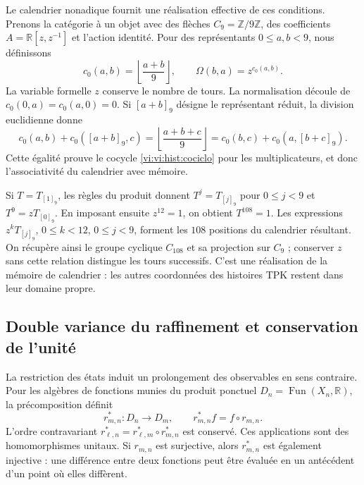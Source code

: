 Le calendrier nonadique fournit une réalisation effective de ces
conditions. Prenons la catégorie à un objet avec des flèches
\(C_9=\mathbb Z/9\mathbb Z\), des coefficients
\(A=\mathbb R[z,z^{-1}]\) et l’action identité. Pour des représentants
\(0\le a,b<9\), nous définissons
\begin{equation}
 c_0(a,b)=\left\lfloor\frac{a+b}{9}\right\rfloor,
 \qquad\Omega(b,a)=z^{c_0(a,b)}.
 \label{vi:vi:hist:carry-calendario}
\end{equation}
La variable formelle \(z\) conserve le nombre de tours. La normalisation
découle de \(c_0(0,a)=c_0(a,0)=0\). Si \([a+b]_9\) désigne le
représentant réduit, la division euclidienne donne
\[
 c_0(a,b)+c_0([a+b]_9,c)
 =\left\lfloor\frac{a+b+c}{9}\right\rfloor
 =c_0(b,c)+c_0(a,[b+c]_9).
\]
Cette égalité prouve le cocycle \eqref{vi:vi:hist:cociclo} pour les
multiplicateurs, et donc l’associativité du calendrier avec mémoire.

Si \(T=T_{[1]_9}\), les règles du produit donnent
\(T^j=T_{[j]_9}\) pour \(0\le j<9\) et \(T^9=zT_{[0]_9}\).
En imposant ensuite \(z^{12}=1\), on obtient \(T^{108}=1\).
Les expressions \(z^kT_{[j]_9}\), \(0\le k<12\), \(0\le j<9\),
forment les \(108\) positions du calendrier résultant. On récupère ainsi
le groupe cyclique \(C_{108}\) et sa projection sur \(C_9\) ; conserver
\(z\) sans cette relation distingue les tours successifs. C’est une
réalisation de la mémoire de calendrier : les autres coordonnées des
histoires TPK restent dans leur domaine propre.

\subsection{Double variance du raffinement et conservation de l’unité}
\label{vi:hist:doble-varianza}

La restriction des états induit un prolongement des observables en sens
contraire. Pour les algèbres de fonctions munies du produit ponctuel
\(D_n=\operatorname{Fun}(X_n,\mathbb R)\), la précomposition définit
\begin{equation}
 r_{m,n}^*:D_n\longrightarrow D_m,
 \qquad r_{m,n}^*f=f\circ r_{m,n}.
 \label{vi:vi:hist:precomposicion}
\end{equation}
L’ordre contravariant
\(r_{\ell,n}^*=r_{\ell,m}^*\circ r_{m,n}^*\) est conservé. Ces applications
sont des homomorphismes unitaux. Si \(r_{m,n}\) est surjective, alors
\(r_{m,n}^*\) est également injective : une différence entre deux fonctions peut
être évaluée en un antécédent d’un point où elles diffèrent.

